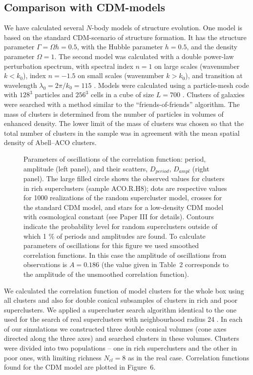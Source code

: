 \subsection{ Comparison with CDM-models}

We have calculated several $N$-body models of structure evolution. One model
is based on the standard CDM-scenario of structure formation.  It has the
structure parameter $\Gamma= \Omega h=0.5$, with the Hubble parameter $h=0.5$,
and the density parameter $\Omega=1$.  The second model was calculated with a
double power-law perturbation spectrum, with spectral index $n=1$ on large
scales (wavenumber $k<k_0$), index $n=-1.5$ on small scales (wavenumber
$k>k_0$), and transition at wavelength $\lambda_0=2\pi/k_0=115$ \Mpc.  Models
were calculated using a particle-mesh code with $128^3$ particles and $256^3$
cells in a cube of size $L=700$ \Mpc.  Clusters of galaxies were searched with
a method similar to the ``friends-of-friends'' algorithm. The mass of clusters
is determined from the number of particles in volumes of enhanced density.
The lower limit of the mass of clusters was chosen so that the total number of
clusters in the sample was in agreement with the mean spatial density of
Abell--ACO clusters.


\begin{figure}
\epsfysize=7cm
\caption{
Parameters of oscillations of the correlation function: period,
amplitude (left panel), and their scatters, $D_{period}$, $D_{ampl}$
(right panel). The large filled circle shows the observed values for
clusters in rich superclusters (sample ACO.R.H8); dots are
respective values for 1000 realizations of the random supercluster
model, crosses for the standard CDM model, and stars for a low-density
CDM model with cosmological constant (see Paper III for details).
Contours indicate the probability level for random superclusters
outside of which 1 \% of periods and amplitudes are found. To
calculate parameters of oscillations for this figure we used smoothed
correlation functions. In this case the amplitude of oscillations from
observations is $A=0.186$ (the value given in Table~2 corresponds to
the amplitude of the unsmoothed correlation function).}
\label{fig7}
\end{figure}



We calculated the correlation function of model clusters for the whole
box using all clusters and also for double conical subsamples of
clusters in rich and poor superclusters. We applied a supercluster search
algorithm identical to the one used for the search of real
superclusters with neighbourhood radius 24 \Mpc. In each
of our simulations we constructed three double conical volumes (cone
axes directed along the three axes) and searched clusters in these
volumes. Clusters were divided into two populations -- one in rich
superclusters and the other in poor ones, with limiting richness
$N_{cl}=8$ as in the real case.  Correlation functions found for the
CDM model are plotted in Figure~6.

